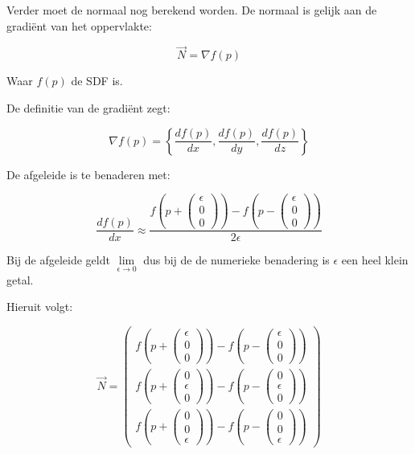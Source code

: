 \documentclass[12pt, a4paper]{article}
\newcommand*{\ora}{\overrightarrow}
\begin{document}
Verder moet de normaal nog berekend worden. De normaal is gelijk aan de gradiënt van het oppervlakte:

\[\ora{N} = \nabla f(p)\]

Waar $f(p)$ de SDF is.

De definitie van de gradiënt zegt:

\[\nabla f(p)=\left\{\frac{df(p)}{dx},\frac{df(p)}{dy},\frac{df(p)}{dz}\right\}\]

De afgeleide is te benaderen met:

\[\frac{df(p)}{dx}\approx\frac{f\left(p+\begin{pmatrix} \epsilon \\ 0 \\ 0 \end{pmatrix}\right)-f\left(p-\begin{pmatrix} \epsilon \\ 0 \\ 0 \end{pmatrix}\right)}{2\epsilon}\]

Bij de afgeleide geldt $\lim\limits_{\epsilon \to 0}$ dus bij de de numerieke benadering is $\epsilon$ een heel klein getal.

Hieruit volgt:

\[
\ora{N}=\begin{pmatrix} 
f\left(p+\begin{pmatrix} \epsilon \\ 0 \\ 0 \end{pmatrix}\right)-f\left(p-\begin{pmatrix} \epsilon \\ 0 \\ 0 \end{pmatrix}\right) \\
f\left(p+\begin{pmatrix} 0 \\ \epsilon \\ 0 \end{pmatrix}\right)-f\left(p-\begin{pmatrix} 0 \\ \epsilon \\ 0 \end{pmatrix}\right) \\
f\left(p+\begin{pmatrix} 0 \\ 0 \\ \epsilon \end{pmatrix}\right)-f\left(p-\begin{pmatrix} 0 \\ 0 \\ \epsilon \end{pmatrix}\right)
\end{pmatrix}\]
\end{document}
